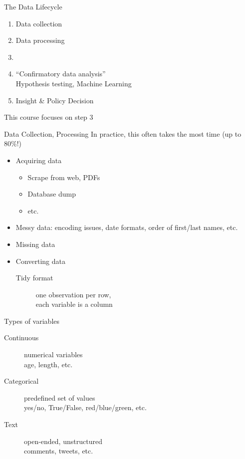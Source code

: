 \documentclass[aspectratio=169,usenames,dvipsnames]{beamer}
\begin{document}
\begin{frame}{The Data Lifecycle}
    \begin{enumerate}
        \item Data collection
        \item Data processing
        \item {}
        \item ``Confirmatory data analysis'' \\
            Hypothesis testing, Machine Learning
        \item Insight \& Policy Decision
    \end{enumerate}

    \vspace{1em}
    This course focuses on step 3
\end{frame}

\begin{frame}{Data Collection, Processing}
In practice, this often takes the most time (up to 80\%!)

\begin{itemize}
    \item Acquiring data
        \begin{itemize}
            \item Scrape from web, PDFs
            \item Database dump
            \item etc.
        \end{itemize}
    \item Messy data: encoding issues, date formats, order of first/last names, etc.
    \item Missing data
    \item Converting data
        \begin{description}
            \item[Tidy format] one observation per row, \\
                    each variable is a column
        \end{description}
\end{itemize}
\end{frame}



\begin{frame}{Types of variables}
    \begin{description}
        \item[Continuous] numerical variables\\
            age, length, etc.
        \item[Categorical] predefined set of values\\
            yes/no, True/False, red/blue/green, etc.
        \item[Text] open-ended, unstructured \\
            comments, tweets, etc.
    \end{description}
\end{frame}
\end{document}
